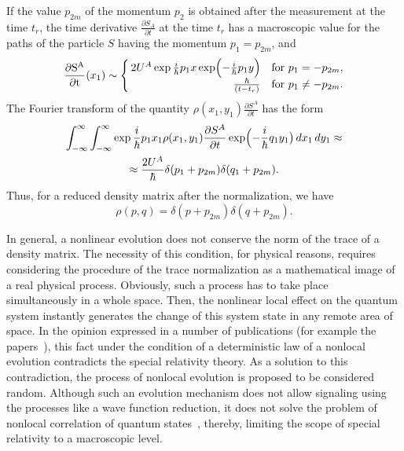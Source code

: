 If the value $p_{2m}$ of the momentum $p_2$ is obtained after the measurement at the time $t_r$, the time derivative $\frac{\partial S_A}{\partial t}$ at the time $t_r$ has a macroscopic value for the paths of the particle $S$ having the momentum $p_1=p_{2m}$, and 
\[\operatorname{\frac{\partial S^A}{\partial t}}(x_1)\sim\left\{
\begin{array}{@{\,}r@{\quad}l@{}}
2U^A\exp\frac{i}{\hbar}p_1x\exp\Bigl(-\frac{i}{\hbar}p_1y\Bigr) & \text{for } p_1=-p_{2m},\\ \frac{\hbar}{(t-t_r)} & \text{for } p_1\neq-p_{2m}.
\end{array}\right. \]
The Fourier transform of the quantity $\rho(x_1,y_1)\frac{\partial S^A}{\partial t}$ has the form
\begin{multline*}
\int _{-\infty}^{\infty}\int _{-\infty}^{\infty}\exp\frac{i}{\hbar}p_1x_1\rho(x_1,y_1)\frac{\partial S^A}{\partial t}\exp\Bigl(-\frac{i}{\hbar}q_1y_1\bigr)\,dx_1\,dy_1\approx\\\approx\frac{2U^A}{\hbar}\delta(p_1+p_{2m})\delta(q_1+p_{2m}).
\end{multline*}
Thus, for a reduced density matrix after the normalization, we have 
\begin{equation*}
\rho(p,q)=\delta(p+p_{2m})\delta(q+p_{2m}).
\end{equation*}

In general, a nonlinear evolution does not conserve the norm of the trace of a density matrix. The necessity of this condition, for physical reasons, requires considering the procedure of the trace normalization as a mathematical image of a real physical process. Obviously, such a process has to take place simultaneously in a whole space. Then, the nonlinear local effect on the quantum system instantly generates the change of this system state in any remote area of space. In the opinion expressed in a number of publications (for example the papers~\cite{bib:16,bib:17}), this fact under the condition of a deterministic law of a nonlocal evolution contradicts the special relativity theory. As a solution to this contradiction, the process of nonlocal evolution is proposed to be considered random. Although such an evolution mechanism does not allow signaling using the processes like a wave function reduction, it does not solve the problem of nonlocal correlation of quantum states~\cite{bib:18,bib:19}, thereby, limiting the scope of special relativity to a macroscopic level.

